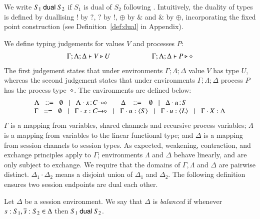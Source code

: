 We write $S_1 \ \mathsf{dual}\  S_2$ if 
$S_1$ is dual of $S_2$ following \cite{TGC14}.  
Intuitively, 
the duality of types is defined by 
duallising $!$ by $?$, $?$ by $!$, $\oplus$ by $\&$ and $\&$ by $\oplus$,  
incorporating the fixed point construction 
(see Definition~\ref{def:dual} in Appendix). 

\noi We define typing judgements for values $V$
and processes $P$:
%
\[	\begin{array}{c}
		\Gamma; \Lambda; \Delta \vdash V \triangleright U \qquad \qquad \qquad \Gamma; \Lambda; \Delta \vdash P \triangleright \diamond
	\end{array}
\]
The first judgement
states that under environments $\Gamma; \Lambda; \Delta$ value $V$
has type $U$, whereas the second judgement states that under
environments $\Gamma; \Lambda; \Delta$ process $P$ has the process type~$\diamond$. The environments are defined below:
\[
\begin{array}{l}
 \Lambda \bnfis  \emptyset \bnfbar \Lambda \cat \AT{x}{\lhot{C}}
\quad\quad \Delta  \ \bnfis  \ \emptyset \bnfbar \Delta \cat \AT{u}{S} \\
 \Gamma  \bnfis  \emptyset \bnfbar \Gamma \cat \varp{x}: \shot{C} \bnfbar \Gamma \cat u: \chtype{S} \bnfbar \Gamma \cat u: \chtype{L} 
        \bnfbar \Gamma \cat \rvar{X}: \Delta
\end{array}
\]
\noi 
$\Gamma$ is a mapping from variables, shared channels and recursive 
process variables;  $\Lambda$ is a mapping from variables to 
the linear functional type; and $\Delta$ is a mapping from 
session channels to session types. 
As expected, weakening, contraction, and exchange principles apply to
$\Gamma$; environments $\Lambda$ and $\Delta$ behave linearly, and are
only subject to exchange.  We require that the domains of $\Gamma,
\Lambda$ and $\Delta$ are pairwise distinct. $\Delta_1\cdot \Delta_2$ means 
a disjoint union of $\Delta_1$ and $\Delta_2$.  
The following definition ensures two session endpoints 
are dual each other. 

\smallskip

\begin{definition}[Balanced]\label{d:wtenv}%
	Let $\Delta$ be a session environment.
	We say that $\Delta$ is {\em balanced} if whenever
	$s: S_1, \overline{s}: S_2 \in \Delta$ then $S_1 \ \mathsf{dual}\  S_2$.
\end{definition}

